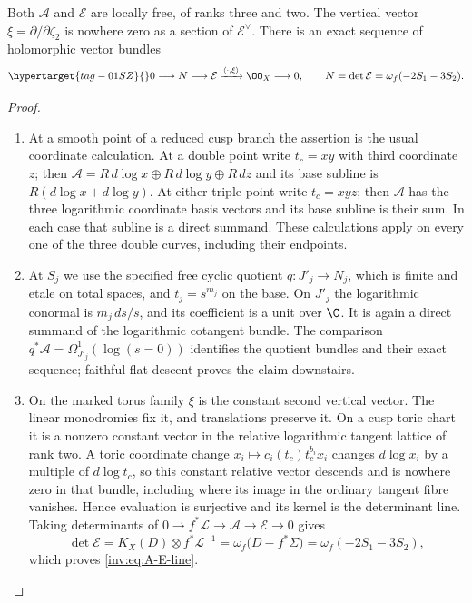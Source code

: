 \begin{proposition}\hypertarget{tag-01RR}{}\label{inv:A1.1}

Both $\mathcal A$ and $\mathcal E$ are locally free, of ranks three and
two.  The vertical vector $\xi=\partial/\partial\zeta_2$ is nowhere
zero as a section of $\mathcal E^\vee$.  There is an exact sequence
of holomorphic vector bundles
\begin{equation}\hypertarget{tag-01SZ}{}\label{inv:eq:A-E-line}
0\longrightarrow N\longrightarrow\mathcal E
 \xrightarrow{\langle\cdot,\xi\rangle}\OO_X\longrightarrow0,
\qquad N=\det\mathcal E=\omega_f(-2S_1-3S_2).
\end{equation}
\end{proposition}


\begin{proof}
\begin{enumerate}[label=\arabic*.,leftmargin=*]
\item At a smooth point of a reduced cusp branch the assertion is the usual
coordinate calculation.  At a double point write $t_c=xy$ with third
coordinate $z$; then
$\mathcal A=R\,d\log x\oplus R\,d\log y\oplus R\,dz$ and its
base subline is $R(d\log x+d\log y)$.  At either triple point write
$t_c=xyz$; then $\mathcal A$ has the three logarithmic coordinate
basis vectors and its base subline is their sum.  In each case that
subline is a direct summand.  These calculations apply on every one
of the three double curves, including their endpoints.

\item At $S_j$ we use the specified free cyclic quotient
$q:J'_j\to N_j$, which is finite and etale on total spaces, and
$t_j=s^{m_j}$ on the base.  On $J'_j$ the logarithmic conormal is
$m_j\,ds/s$, and its coefficient is a unit over $\C$.  It is again a
direct summand of the logarithmic cotangent bundle.  The comparison
$q^*\mathcal A=\Omega_{J'_j}^1(\log(s=0))$ identifies the quotient
bundles and their exact sequence; faithful flat descent proves the
claim downstairs.

\item On the marked torus family $\xi$ is the constant second vertical
vector.  The linear monodromies fix it, and translations preserve it.
On a cusp toric chart it is a nonzero constant vector in the relative
logarithmic tangent lattice of rank two.  A toric coordinate change
$x_i\mapsto c_i(t_c)t_c^{b_i}x_i$ changes $d\log x_i$ by a multiple
of $d\log t_c$, so this constant relative vector descends and is
nowhere zero in that bundle, including where its image in the
ordinary tangent fibre vanishes. Hence evaluation is surjective and its kernel
is the determinant line.  Taking determinants of
$0\to f^*\mathcal L\to\mathcal A\to\mathcal E\to0$ gives
\[
\det\mathcal E=K_X(D)\otimes f^*\mathcal L^{-1}
=\omega_f\bigl(D-f^*\Sigma\bigr)
=\omega_f(-2S_1-3S_2),
\]
which proves \eqref{inv:eq:A-E-line}.
\end{enumerate}
\end{proof}